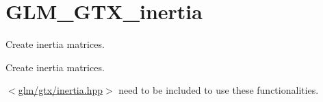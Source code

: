 \hypertarget{group__gtx__inertia}{}\section{G\+L\+M\+\_\+\+G\+T\+X\+\_\+inertia}
\label{group__gtx__inertia}


Create inertia matrices.  


Create inertia matrices. 

$<$\hyperlink{inertia_8hpp}{glm/gtx/inertia.\+hpp}$>$ need to be included to use these functionalities. 